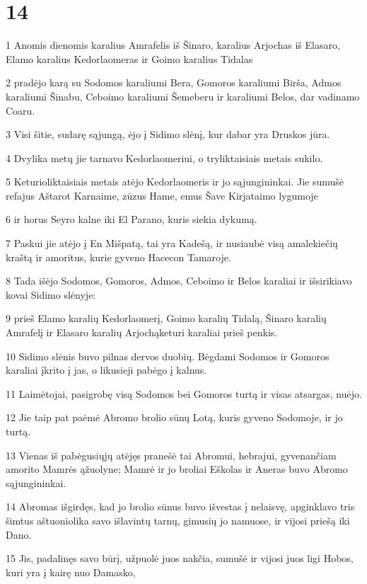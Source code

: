\chapter{14}


\par 1 Anomis dienomis karalius Amrafelis iš Šinaro, karalius Arjochas iš Elasaro, Elamo karalius Kedorlaomeras ir Goimo karalius Tidalas 
\par 2 pradėjo karą su Sodomos karaliumi Bera, Gomoros karaliumi Birša, Admos karaliumi Šinabu, Ceboimo karaliumi Šemeberu ir karaliumi Belos, dar vadinamo Coaru. 
\par 3 Visi šitie, sudarę sąjungą, ėjo į Sidimo slėnį, kur dabar yra Druskos jūra. 
\par 4 Dvylika metų jie tarnavo Kedorlaomeriui, o tryliktaisiais metais sukilo. 
\par 5 Keturioliktaisiais metais atėjo Kedorlaomeris ir jo sąjungininkai. Jie sumušė refajus Aštarot Karnaime, zūzus Hame, emus Šave Kirjataimo lygumoje 
\par 6 ir horus Seyro kalne iki El Parano, kuris siekia dykumą. 
\par 7 Paskui jie atėjo į En Mišpatą, tai yra Kadešą, ir nusiaubė visą amalekiečių kraštą ir amoritus, kurie gyveno Hacecon Tamaroje. 
\par 8 Tada išėjo Sodomos, Gomoros, Admos, Ceboimo ir Belos karaliai ir išsirikiavo kovai Sidimo slėnyje: 
\par 9 prieš Elamo karalių Kedorlaomerį, Goimo karalių Tidalą, Šinaro karalių Amrafelį ir Elasaro karalių Arjochą­keturi karaliai prieš penkis. 
\par 10 Sidimo slėnis buvo pilnas dervos duobių. Bėgdami Sodomos ir Gomoros karaliai įkrito į jas, o likusieji pabėgo į kalnus. 
\par 11 Laimėtojai, pasigrobę visą Sodomos bei Gomoros turtą ir visas atsargas, nuėjo. 
\par 12 Jie taip pat paėmė Abromo brolio sūnų Lotą, kuris gyveno Sodomoje, ir jo turtą. 
\par 13 Vienas iš pabėgusiųjų atėjęs pranešė tai Abromui, hebrajui, gyvenančiam amorito Mamrės ąžuolyne; Mamrė ir jo broliai Eškolas ir Aneras buvo Abromo sąjungininkai. 
\par 14 Abromas išgirdęs, kad jo brolio sūnus buvo išvestas į nelaisvę, apginklavo tris šimtus aštuoniolika savo išlavintų tarnų, gimusių jo namuose, ir vijosi priešą iki Dano. 
\par 15 Jis, padalinęs savo būrį, užpuolė juos nakčia, sumušė ir vijosi juos ligi Hobos, kuri yra į kairę nuo Damasko, 
